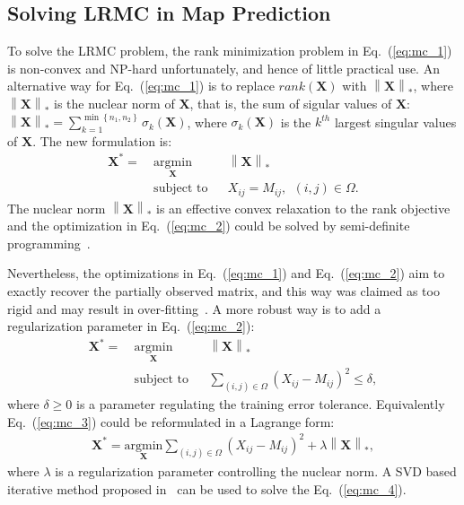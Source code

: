 \subsection{Solving LRMC in Map Prediction}
\label{sect:static}

To solve the LRMC problem, %
the rank minimization problem in Eq.~(\ref{eq:mc_1}) is non-convex and NP-hard unfortunately, and hence of little practical use. An alternative way for Eq.~(\ref{eq:mc_1}) is to replace $rank(\mathbf{X})$ with $\left \| \mathbf{X} \right \|_*$, where $\left \| \mathbf{X} \right \|_*$ is the nuclear norm of $\mathbf{X}$, that is, the sum of sigular values of $\mathbf{X}$: $\left \| \mathbf{X} \right \|_* = \sum_{k=1}^{\min \left \{ n_1, n_2 \right \}}\sigma_k(\mathbf{X})$, where $\sigma_k(\mathbf{X})$ is the $k^{th}$ largest singular values of $\mathbf{X}$. The new formulation is:
\begin{equation}
    \label{eq:mc_2}
    \begin{aligned}
        \mathbf{X}^* = ~&\underset{\mathbf{X}}{\text{argmin}} 
               &&\left \| \mathbf{X} \right \|_*\\
               &\text{subject to}
               && X_{ij} = M_{ij},~~\left ( i, j \right )\in \Omega.
    \end{aligned}
\end{equation}
The nuclear norm $\left \| \mathbf{X} \right \|_*$ is an effective convex relaxation to the rank objective and the optimization in Eq.~(\ref{eq:mc_2}) could be solved by semi-definite programming~\cite{laurent2014positive}.

Nevertheless, the optimizations in Eq.~(\ref{eq:mc_1}) and Eq.~(\ref{eq:mc_2}) aim to exactly recover the partially observed matrix, and this way was claimed as too rigid and may result in over-fitting~\cite{mazumder2010spectral}. A more robust way is to add a regularization parameter in Eq.~(\ref{eq:mc_2}):
\begin{equation}
    \label{eq:mc_3}
    \begin{aligned}
        \mathbf{X}^* = ~&\underset{\mathbf{X}}{\text{argmin}} 
               &&\left \| \mathbf{X} \right \|_*\\
               &\text{subject to}
               && \sum_{(i, j)\in \Omega}(X_{ij} - M_{ij})^2\leq \delta,
    \end{aligned}
\end{equation}
where $\delta \geq 0$ is a parameter regulating the training error tolerance. Equivalently Eq.~(\ref{eq:mc_3}) could be reformulated in a Lagrange form:
\begin{equation}
    \label{eq:mc_4}
    \begin{aligned}
        \mathbf{X}^* = \underset{\mathbf{X}}{\text{argmin}} \sum_{(i, j)\in \Omega} (X_{ij} - M_{ij})^2 + \lambda \left \|\mathbf{X} \right \|_{*},
    \end{aligned}
\end{equation}
where $\lambda$ is a regularization parameter controlling the nuclear norm. A SVD based iterative method proposed in~\cite{mazumder2010spectral} can be used to solve the Eq.~(\ref{eq:mc_4}).


